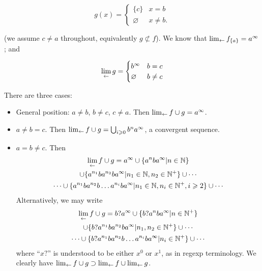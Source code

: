 \documentclass{article}
\theoremstyle{definition}
\let\emptyset\varnothing
\begin{document}
\begin{equation}
  g(x) = \begin{cases}
    \lbrace c\rbrace & x=b\\
    \emptyset & x\neq b.
    \end{cases}
\end{equation}

(we assume $c\neq a$ throughout, equivalently $g\not\subset f$).  We
know that $\lim_{\leftarrow} f_{\lbrace a\rbrace}=a^\infty$; and

\begin{equation}
  \invlim{g}=\begin{cases}
  b^\infty & b=c\\
  \emptyset &b\neq c
  \end{cases}
\end{equation}


There are three cases:

\begin{itemize}
\item General position: $a\neq b$, $b\neq c$, $c\neq a$.  Then
  $\lim_{\leftarrow} f\cup g=a^\infty$.
\item $a\neq b=c$.  Then $\lim_{\leftarrow} f\cup g=\bigcup_{i\geqslant
  0}b^na^\infty$, a convergent sequence.
\item $a=b\neq c$.  Then
  \begin{multline}
    \lim_{\leftarrow} f\cup g=
    a^\infty\cup
    \lbrace a^nba^\infty|n\in\mathbb{N}\rbrace\\
    \cup\lbrace a^{n_1}ba^{n_2}ba^\infty|n_1\in\mathbb{N},n_2\in\mathbb{N^+}\rbrace
    \cup\cdots\\
    \cdots\cup\lbrace a^{n_1}ba^{n_2}b\ldots a^{n_i}ba^\infty|n_1\in\mathbb{N},n_i\in\mathbb{N}^+,i\geqslant 2\rbrace
    \cup\cdots
  \end{multline}
  Alternatively, we may write
  \begin{multline}
    \lim_{\leftarrow} f\cup g=
    b?a^\infty\cup
    \lbrace b?a^nba^\infty|n\in\mathbb{N^+}\rbrace\\
    \cup\lbrace b?a^{n_1}ba^{n_2}ba^\infty|n_1,n_2\in\mathbb{N^+}\rbrace
    \cup\cdots\\
    \cdots\cup\lbrace b?a^{n_1}ba^{n_2}b\ldots a^{n_i}ba^\infty|n_i\in\mathbb{N}^+\rbrace\cup\cdots
  \end{multline}
  where ``$x?$'' is understood to be either $x^0$ or $x^1$, as in
  regexp terminology.  We clearly have $\lim_{\leftarrow} f\cup
    g\supset\lim_{\leftarrow} f\cup\lim_{\leftarrow} g$.
\end{itemize}
\end{document}
